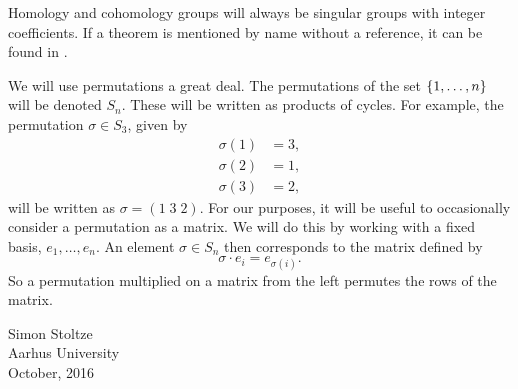 Homology and cohomology groups will always be singular groups
with integer coefficients. If a theorem is mentioned by name without a
reference, it can be found in \cite{hatcher}.

We will use permutations a great deal. The permutations of the set
$\left\{ 1,\dots,n \right\}$ will be denoted $S_n$.
These will be written as products of cycles. For example, the
permutation $\sigma\in S_3$, given by
\begin{align*}
  \sigma(1) &= 3, \\
  \sigma(2) &= 1, \\
  \sigma(3) &= 2,
\end{align*}
will be written as $\sigma = (1 \; 3 \; 2)$.
For our purposes, it will be useful to occasionally consider
a permutation as a matrix. We will do this by working with a fixed
basis, $e_1,\dots,e_n$. An element $\sigma \in S_n$ then
corresponds to the matrix defined by
\[ \sigma \cdot e_i = e_{\sigma(i)}. \]
So a permutation multiplied on a matrix from the left permutes the
rows of the matrix.

\vfill
\begin{flushright}
  Simon Stoltze \\
  Aarhus University\\
  October, 2016
\end{flushright}




